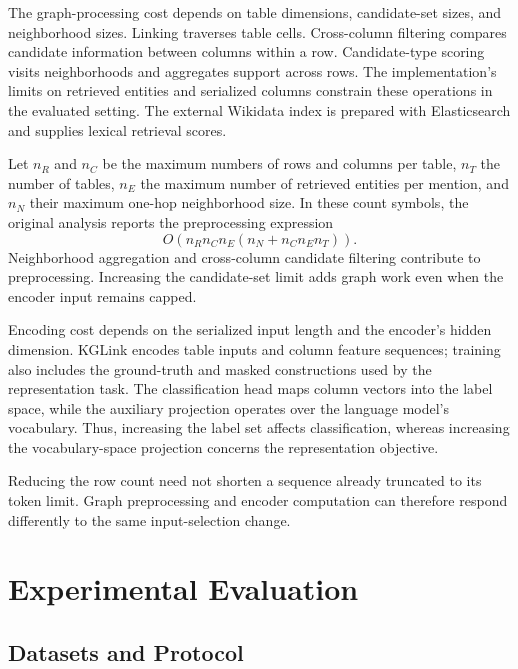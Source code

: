 The graph-processing cost depends on table dimensions, candidate-set sizes, and neighborhood sizes. Linking traverses table cells. Cross-column filtering compares candidate information between columns within a row. Candidate-type scoring visits neighborhoods and aggregates support across rows. The implementation's limits on retrieved entities and serialized columns constrain these operations in the evaluated setting. The external Wikidata index is prepared with Elasticsearch and supplies lexical retrieval scores.

Let $n_R$ and $n_C$ be the maximum numbers of rows and columns per table, $n_T$ the number of tables, $n_E$ the maximum number of retrieved entities per mention, and $n_N$ their maximum one-hop neighborhood size. In these count symbols, the original analysis reports the preprocessing expression
\begin{equation}
O\!\left(n_R n_C n_E(n_N+n_C n_E n_T)\right).
\label{eq:kglink:preprocessing}
\end{equation}
Neighborhood aggregation and cross-column candidate filtering contribute to preprocessing. Increasing the candidate-set limit adds graph work even when the encoder input remains capped.

Encoding cost depends on the serialized input length and the encoder's hidden dimension. KGLink encodes table inputs and column feature sequences; training also includes the ground-truth and masked constructions used by the representation task. The classification head maps column vectors into the label space, while the auxiliary projection operates over the language model's vocabulary. Thus, increasing the label set affects classification, whereas increasing the vocabulary-space projection concerns the representation objective.

Reducing the row count need not shorten a sequence already truncated to its token limit. Graph preprocessing and encoder computation can therefore respond differently to the same input-selection change.

\section{Experimental Evaluation}
\label{sec:kglink:experiments}

\subsection{Datasets and Protocol}
\label{sec:kglink:protocol}

